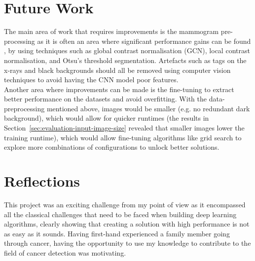 
\section{Future Work}

The main area of work that requires improvements is the mammogram pre-processing as it is often an area where significant performance gains can be found \citep{Litjens2017}, by using techniques such as global contrast normalisation (GCN), local contrast normalisation, and Otsu’s threshold segmentation. Artefacts such as tags on the x-rays and black backgrounds should all be removed using computer vision techniques to avoid having the CNN model poor features.\\

Another area where improvements can be made is the fine-tuning to extract better performance on the datasets and avoid overfitting. With the data-preprocessing mentioned above, images would be smaller (e.g. no redundant dark background), which would allow for quicker runtimes (the results in Section~\ref{sec:evaluation-input-image-size} revealed that smaller images lower the training runtime), which would allow fine-tuning algorithms like grid search to explore more combinations of configurations to unlock better solutions.
    

\section{Reflections}

This project was an exciting challenge from my point of view as it encompassed all the classical challenges that need to be faced when building deep learning algorithms, clearly showing that creating a solution with high performance is not as easy as it sounds. Having first-hand experienced a family member going through cancer, having the opportunity to use my knowledge to contribute to the field of cancer detection was motivating.